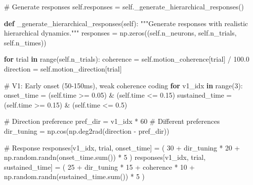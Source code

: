 \documentclass[
  11pt,
  letterpaper,
  oneside,
  openany]{book}
\newenvironment{Shaded}{\begin{snugshade}}{\end{snugshade}}
\newcommand{\BuiltInTok}[1]{\textcolor[rgb]{0.00,0.23,0.31}{#1}}
\newcommand{\CommentTok}[1]{\textcolor[rgb]{0.37,0.37,0.37}{#1}}
\newcommand{\ControlFlowTok}[1]{\textcolor[rgb]{0.00,0.23,0.31}{\textbf{#1}}}
\newcommand{\DecValTok}[1]{\textcolor[rgb]{0.68,0.00,0.00}{#1}}
\newcommand{\FloatTok}[1]{\textcolor[rgb]{0.68,0.00,0.00}{#1}}
\newcommand{\KeywordTok}[1]{\textcolor[rgb]{0.00,0.23,0.31}{\textbf{#1}}}
\newcommand{\NormalTok}[1]{\textcolor[rgb]{0.00,0.23,0.31}{#1}}
\newcommand{\OperatorTok}[1]{\textcolor[rgb]{0.37,0.37,0.37}{#1}}
\newcommand{\VariableTok}[1]{\textcolor[rgb]{0.07,0.07,0.07}{#1}}
\begin{document}
\begin{Shaded}
\begin{Highlighting}[]
        \CommentTok{\# Generate responses}
        \VariableTok{self}\NormalTok{.responses }\OperatorTok{=} \VariableTok{self}\NormalTok{.\_generate\_hierarchical\_responses()}
    
    \KeywordTok{def}\NormalTok{ \_generate\_hierarchical\_responses(}\VariableTok{self}\NormalTok{):}
        \CommentTok{"""Generate responses with realistic hierarchical dynamics."""}
\NormalTok{        responses }\OperatorTok{=}\NormalTok{ np.zeros((}\VariableTok{self}\NormalTok{.n\_neurons, }\VariableTok{self}\NormalTok{.n\_trials, }\VariableTok{self}\NormalTok{.n\_times))}
        
        \ControlFlowTok{for}\NormalTok{ trial }\KeywordTok{in} \BuiltInTok{range}\NormalTok{(}\VariableTok{self}\NormalTok{.n\_trials):}
\NormalTok{            coherence }\OperatorTok{=} \VariableTok{self}\NormalTok{.motion\_coherence[trial] }\OperatorTok{/} \FloatTok{100.0}
\NormalTok{            direction }\OperatorTok{=} \VariableTok{self}\NormalTok{.motion\_direction[trial]}
            
            \CommentTok{\# V1: Early onset (50{-}150ms), weak coherence coding}
            \ControlFlowTok{for}\NormalTok{ v1\_idx }\KeywordTok{in} \BuiltInTok{range}\NormalTok{(}\DecValTok{3}\NormalTok{):}
\NormalTok{                onset\_time }\OperatorTok{=}\NormalTok{ (}\VariableTok{self}\NormalTok{.time }\OperatorTok{\textgreater{}=} \FloatTok{0.05}\NormalTok{) }\OperatorTok{\&}\NormalTok{ (}\VariableTok{self}\NormalTok{.time }\OperatorTok{\textless{}=} \FloatTok{0.15}\NormalTok{)}
\NormalTok{                sustained\_time }\OperatorTok{=}\NormalTok{ (}\VariableTok{self}\NormalTok{.time }\OperatorTok{\textgreater{}=} \FloatTok{0.15}\NormalTok{) }\OperatorTok{\&}\NormalTok{ (}\VariableTok{self}\NormalTok{.time }\OperatorTok{\textless{}=} \FloatTok{0.5}\NormalTok{)}
                
                \CommentTok{\# Direction preference}
\NormalTok{                pref\_dir }\OperatorTok{=}\NormalTok{ v1\_idx }\OperatorTok{*} \DecValTok{60}  \CommentTok{\# Different preferences}
\NormalTok{                dir\_tuning }\OperatorTok{=}\NormalTok{ np.cos(np.deg2rad(direction }\OperatorTok{{-}}\NormalTok{ pref\_dir))}
                
                \CommentTok{\# Response}
\NormalTok{                responses[v1\_idx, trial, onset\_time] }\OperatorTok{=}\NormalTok{ (}
                    \DecValTok{30} \OperatorTok{+}\NormalTok{ dir\_tuning }\OperatorTok{*} \DecValTok{20} \OperatorTok{+}\NormalTok{ np.random.randn(onset\_time.}\BuiltInTok{sum}\NormalTok{()) }\OperatorTok{*} \DecValTok{5}
\NormalTok{                )}
\NormalTok{                responses[v1\_idx, trial, sustained\_time] }\OperatorTok{=}\NormalTok{ (}
                    \DecValTok{25} \OperatorTok{+}\NormalTok{ dir\_tuning }\OperatorTok{*} \DecValTok{15} \OperatorTok{+}\NormalTok{ coherence }\OperatorTok{*} \DecValTok{10} \OperatorTok{+} 
\NormalTok{                    np.random.randn(sustained\_time.}\BuiltInTok{sum}\NormalTok{()) }\OperatorTok{*} \DecValTok{5}
\NormalTok{                )}
            

\end{Highlighting}
\end{Shaded}
\end{document}
